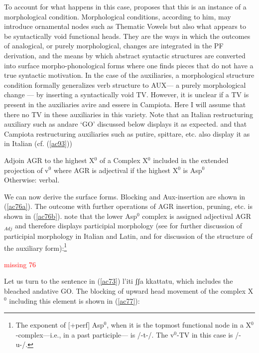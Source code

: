\documentclass[output=paper]{langscibook}
\begin{document}
{To account for what happens in this case, \cite{calabrese2019a, calabrese2020a} proposes  that this is an instance of a morphological condition. Morphological conditions, according to him, may introduce ornamental nodes such as Thematic Vowels but also what appears to be syntactically void functional heads. They are the ways in which the outcomes of analogical, or purely morphological, changes are integrated in the PF derivation, and the means by which abstract syntactic structures are converted into surface morpho-phonological forms where one finds pieces that do not have a true syntactic motivation. In the case of the auxiliaries, a morphological structure condition formally generalizes verb structure to AUX— a purely morphological change — by inserting a syntactically void TV. However, it is unclear if a TV is present in the auxiliaries avire and essere in Campiota. Here I will assume that there no TV in these auxiliaries in this variety.  Note that an Italian restructuring auxiliary such as andare ‘GO’ discussed below displays it as expected. and that Campiota restructuring auxiliaries such as putire, spittare, etc. also display it as in Italian (cf. (\ref{ac93}))
}

\ea \label{ac75} Adjoin AGR to the highest X$^0$ of a Complex X$^0$ included in the extended projection of v$^0$
    \ea \label{ac75a}where AGR is adjectival if the highest X$^0$ is Asp$^0$\\
        Otherwise:
    \ex \label{ac75b}verbal.
   \z 
\z

We can now derive the surface forms. Blocking and Aux-insertion are shown in (\ref{ac76a}).  The outcome with further operations of AGR insertion, pruning, etc. is shown in (\ref{ac76b}).  note that the lower Asp$^0$ complex is assigned adjectival AGR$_{Adj}$ and therefore displays participial morphology (see \cite{calabrese2020a} for further discussion of participial morphology in Italian and Latin, and \cite{calabrese2019a} for discussion of the structure of the auxiliary form):\footnote{The exponent of [+perf] Asp$^0$, when it is the topmost functional node in a X$^0$-complex—i.e., in a past participle— is /-t-/.  The v$^0$-TV in this case is /-u-/.} 


\ea \label{ac76}
\textcolor{red}{missing 76}
    \ea\label{ac76a}
    \ex \label{ac76b}
    \z

\z

Let us turn to the sentence in (\ref{ac73}) l’iti ʃʃa kkattatu, which includes the bleached andative GO.  The blocking of upward head movement of the complex X$^0$ including this element is shown in (\ref{ac77}):
\end{document}
